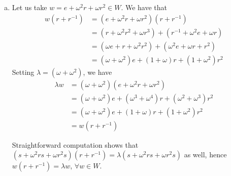 \begin{solution}
\begin{enumerate}[(a)]
    \item Let us take \(w = e + \omega^2 r + \omega r^2 \in W\). We have that
    \begin{align*}
        w(r + r^{-1}) &= (e + \omega^2 r + \omega r^2)(r + r^{-1}) \\
        &= (r + \omega^2 r^2 + \omega r^3) + (r^{-1} + \omega^{2} e + \omega r) \\
        &= (\omega e + r + \omega^2 r^2) + (\omega^2 e + \omega r + r^2) \\
        &= (\omega + \omega^2) e + (1 + \omega) r + (1 + \omega^2) r^2
    \end{align*}
    Setting \(\lambda = (\omega + \omega^2)\), we have
    \begin{align*}
        \lambda w &= (\omega + \omega^2) (e + \omega^2 r + \omega r^2) \\
        &= (\omega + \omega^2) e + (\omega^3 + \omega^4) r + (\omega^2 + \omega^3) r^2 \\
        &= (\omega + \omega^2) e + (1 + \omega) r + (1 + \omega^2) r^2 \\
        &= w (r + r^{-1})
    \end{align*}

    Straightforward computation shows that \((s + \omega^2 r s + \omega r^2 s) (r + r^{-1}) = \lambda (s + \omega^2 r s + \omega r^2 s)\) as well, hence \(w (r + r^{-1}) = \lambda w\), \(\forall w \in W\).
\end{enumerate}
\end{solution}

